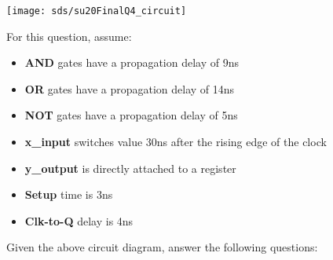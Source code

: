 \begin{blocksection}

\texttt{[image: sds/su20FinalQ4\_circuit]}

\question
For this question, assume:
\begin{itemize}
	\item \textbf{AND} gates have a propagation delay of 9ns
	\item \textbf{OR} gates have a propagation delay of 14ns
	\item \textbf{NOT} gates have a propagation delay of 5ns
	\item \textbf{x\_input} switches value 30ns after the rising edge of the clock
	\item \textbf{y\_output} is directly attached to a register
	\item \textbf{Setup} time is 3ns
	\item \textbf{Clk-to-Q} delay is 4ns
\end{itemize}

Given the above circuit diagram, answer the following questions:

\end{blocksection}
